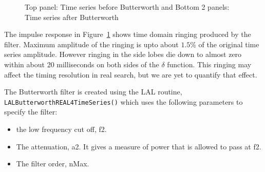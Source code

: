 \documentclass{article}
\begin{document}
\begin{figure}
\begin{center}
\caption{Top panel: Time series before Butterworth and 
Bottom 2 panels: Time series after Butterworth} \label{fig:checkbuttertimeseries}
\end{center}
\end{figure}
The impulse response in Figure~\ref{fig:checkbuttertimeseries} shows  
time domain ringing produced by the filter. Maximum amplitude of 
the ringing is upto about $1.5$\% of the original time series amplitude.
However ringing in the side lobes die down to almost zero within about
20 milliseconds on both sides of the $\delta$ function. This ringing may
affect the timing resolution in real search, but we are yet
to quantify that effect.  

The Butterworth filter is created using the LAL routine,
\texttt{LALButterworthREAL4TimeSeries()} which uses the following 
parameters to specify the filter:
\begin{itemize}
  \item the low frequency cut off, f2. 
  \item The attenuation, a2. It gives a measure of power
    that is allowed to pass at f2.
  \item The filter order, nMax.
\end{itemize}
\end{document}
